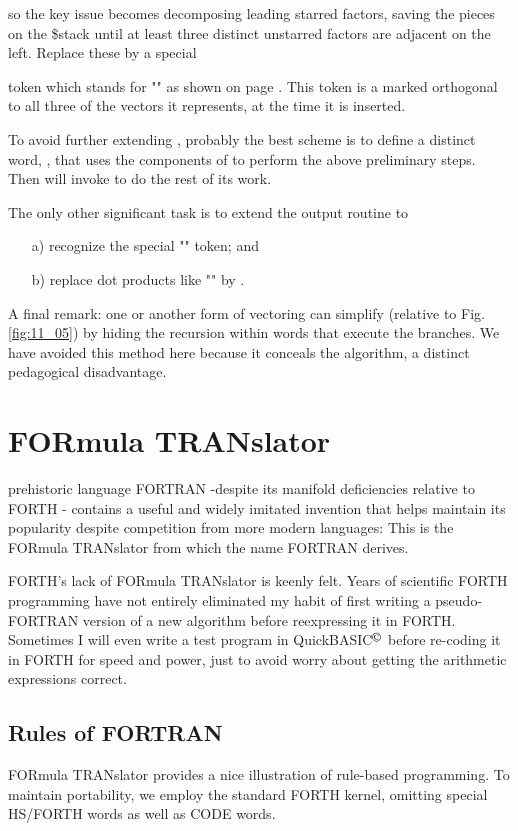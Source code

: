 so the key issue becomes decomposing leading starred factors, saving the pieces on the \$stack until at least three distinct unstarred factors are adjacent on the left. Replace these by a special 

token which stands for "\bc{^}" as shown on page \pageref{page:11_276}. This token is a marked orthogonal to all three of the vectors it represents, at the time it is inserted.

To avoid further extending , probably the best scheme is to define a distinct word, , that uses the components of  to perform the above preliminary steps. Then  will invoke  to do the rest of its work.

The only other significant task is to extend the output routine to

\begin{enumerate}
\item[a)] recognize the special "\bc{^}" token; and
\item[b)] replace dot products like "" by \bc{[a,b,c,d]}.
\end{enumerate}


\leftbar[1\linewidth]
A final remark: one or another form of vectoring can simplify  (relative to Fig. \ref{fig:11_05}) by hiding the recursion within words that execute the branches. We have avoided this method here because it conceals the algorithm, a distinct pedagogical disadvantage.
\endleftbar

\section{FORmula TRANslator}
 prehistoric language FORTRAN -despite its manifold deficiencies relative to FORTH - contains a useful and widely imitated invention that helps maintain its popularity despite competition from more modern languages: This is the FORmula TRANslator from which the name FORTRAN derives.

FORTH's lack of FORmula TRANslator is keenly felt. Years of scientific FORTH programming have not entirely eliminated my habit of first writing a pseudo-FORTRAN version of a new algorithm before reexpressing it in FORTH. Sometimes I will even write a test program in QuickBASIC$^{\copyright}$ before re-coding it in FORTH for speed and power, just to avoid worry about getting the arithmetic expressions correct.

\subsection{Rules of FORTRAN}
 FORmula TRANslator provides a nice illustration of rule-based programming. To maintain portability, we employ the standard FORTH kernel, omitting special HS/FORTH words as well as CODE words.

